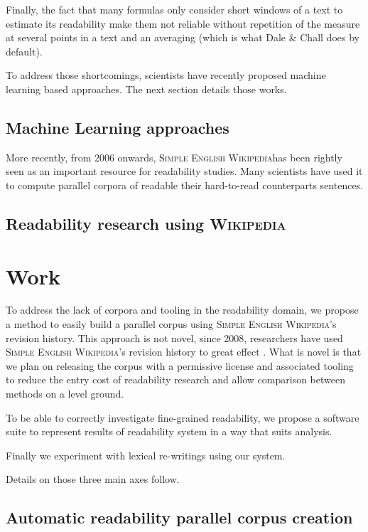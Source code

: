 \documentclass[a4paper, 11pt, onepage]{scrreprt}
\newcommand\wiki{\textsc{Wikipedia}}
\newcommand\sew{\textsc{Simple English Wikipedia}}
\begin{document}
Finally, the fact that many formulas only consider short windows of a
text to estimate its readability make them not reliable without
repetition of the measure at several points in a text and an averaging
(which is what Dale \& Chall does by default).

To address those shortcomings, scientists have recently proposed
machine learning based approaches. The next section details those
works.

\section{Machine Learning approaches}
\label{sec:ml-approaches}

More recently, from 2006 onwards, \sew has been rightly seen as an
important resource for readability studies. Many scientists have used
it to compute parallel corpora of readable their hard-to-read
counterparts sentences.

\section{Readability research using \wiki}
\label{sec:wiki-approaches}

\chapter{Work}
\label{cha:work}

To address the lack of corpora and tooling in the readability domain,
we propose a method to easily build a parallel corpus using \sew's
revision history. This approach is not novel, since 2008, researchers
have used \sew's revision history to great effect
\cite{nelken2008mining}. What is novel is that we plan on releasing
the corpus with a permissive license and associated tooling to reduce
the entry cost of readability research and allow comparison between
methods on a level ground.

To be able to correctly investigate fine-grained readability, we
propose a software suite to represent results of readability system in
a way that suits analysis.

Finally we experiment with lexical re-writings using our system.

Details on those three main axes follow.

\section{Automatic readability parallel corpus creation}
\label{sec:corpus}
\end{document}
